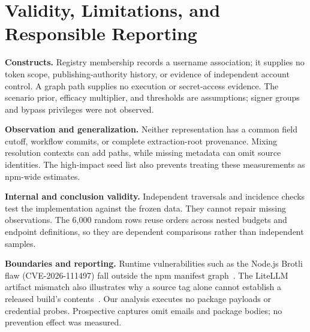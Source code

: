 \section{Validity, Limitations, and Responsible Reporting}
\textbf{Constructs.} Registry membership records a username association; it supplies no token scope, publishing-authority history, or evidence of independent account control. A graph path supplies no execution or secret-access evidence. The scenario prior, efficacy multiplier, and thresholds are assumptions; signer groups and bypass privileges were not observed.

\textbf{Observation and generalization.} Neither representation has a common field cutoff, workflow commits, or complete extraction-root provenance. Mixing resolution contexts can add paths, while missing metadata can omit source identities. The high-impact seed list also prevents treating these measurements as npm-wide estimates.

\textbf{Internal and conclusion validity.} Independent traversals and incidence checks test the implementation against the frozen data. They cannot repair missing observations. The 6,000 random rows reuse orders across nested budgets and endpoint definitions, so they are dependent comparisons rather than independent samples.

\textbf{Boundaries and reporting.} Runtime vulnerabilities such as the Node.js Brotli flaw (CVE-2026-111497) fall outside the npm manifest graph~\cite{nodejsbrotli2026}. The LiteLLM artifact mismatch also illustrates why a source tag alone cannot establish a released build's contents~\cite{litellmincident2026}. Our analysis executes no package payloads or credential probes. Prospective captures omit emails and package bodies; no prevention effect was measured.
